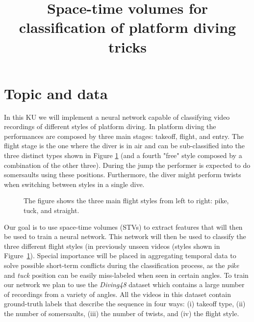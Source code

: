 \documentclass[10pt]{article}
\begin{document}
\noindent



\title{Space-time volumes for classification of platform diving tricks}


\maketitle

\section{Topic and data}

In this KU we will implement a neural network capable of classifying video recordings of different styles of platform diving. In platform diving the performances are composed by three main stages: takeoff, flight, and entry. The flight stage is the one where the diver is in air and can be sub-classified into the three distinct types shown in Figure \ref{fig:dive-styles} (and a fourth "free" style composed by a combination of the other three). During the jump the performer is expected to do somersaults using these positions. Furthermore, the diver might perform twists when switching between styles in a single dive.

\begin{figure}[!htb]
\caption{\label{fig:dive-styles} The figure shows the three main flight styles from left to right: pike, tuck, and straight.}
\end{figure}

Our goal is to use space-time volumes (STVs) to extract features that will then be used to train a neural network. This network will then be used to classify the three different flight styles (in previously unseen videos (styles shown in Figure~\ref{fig:dive-styles}). Special importance will be placed in aggregating temporal data to solve possible short-term conflicts during the classification process, as the \emph{pike} and \emph{tuck} position can be easily miss-labeled when seen in certain angles. To train our network we plan to use the \textit{Diving48} dataset \cite{ref-diving48} which contains a large number of recordings from a variety of angles. All the videos in this dataset contain ground-truth labels that describe the sequence in four ways: (i) takeoff type, (ii) the number of somersaults, (iii) the number of twists, and (iv) the flight style.
\end{document}
